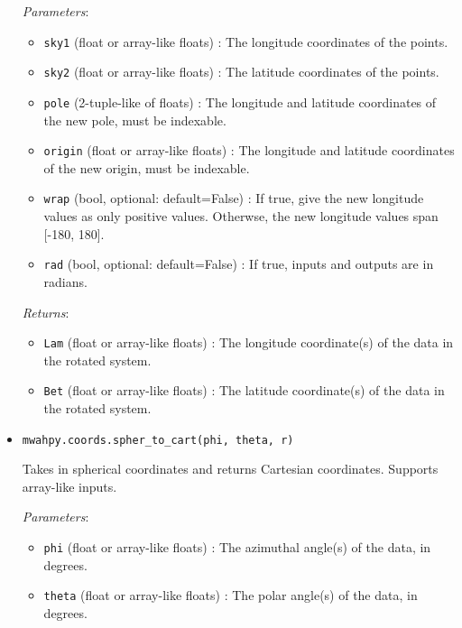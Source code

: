 \documentclass{article}
\begin{document}
\begin{itemize}
\textit{Parameters}: \begin{itemize}

\item \verb!sky1! (float or array-like floats) : The longitude coordinates of the points.

\item \verb!sky2! (float or array-like floats) : The latitude coordinates of the points.

\item \verb!pole! (2-tuple-like of floats) : The longitude and latitude coordinates of the new pole, must be indexable.

\item \verb!origin! (float or array-like floats) : The longitude and latitude coordinates of the new origin, must be indexable.

\item \verb!wrap! (bool, optional: default=False) : If true, give the new longitude values as only positive values. Otherwse, the new longitude values span [-180, 180]. 

\item \verb!rad! (bool, optional: default=False) : If true, inputs and outputs are in radians.

\end{itemize}

\textit{Returns}: \begin{itemize}

\item \verb!Lam! (float or array-like floats) : The longitude coordinate(s) of the data in the rotated system.

\item \verb!Bet! (float or array-like floats) : The latitude coordinate(s) of the data in the rotated system.

\end{itemize}



\item \verb!mwahpy.coords.spher_to_cart(phi, theta, r)!

Takes in spherical coordinates and returns Cartesian coordinates. Supports array-like inputs.

\textit{Parameters}: \begin{itemize}

\item \verb!phi! (float or array-like floats) : The azimuthal angle(s) of the data, in degrees.

\item \verb!theta! (float or array-like floats) : The polar angle(s) of the data, in degrees.


\end{itemize}
\end{itemize}
\end{document}
